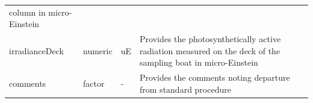 \documentclass[12pt,]{article}
\begin{document}
\begin{longtable}[]{@{}llll@{}}
\begin{minipage}[t]{0.38\columnwidth}
column in micro-Einstein\strut
\end{minipage}\tabularnewline
\begin{minipage}[t]{0.24\columnwidth}\raggedright
irradianceDeck\strut
\end{minipage} & \begin{minipage}[t]{0.15\columnwidth}\raggedright
numeric\strut
\end{minipage} & \begin{minipage}[t]{0.12\columnwidth}\raggedright
uE\strut
\end{minipage} & \begin{minipage}[t]{0.38\columnwidth}\raggedright
Provides the photosynthetically active radiation measured on the deck of
the sampling boat in micro-Einstein\strut
\end{minipage}\tabularnewline
\begin{minipage}[t]{0.24\columnwidth}\raggedright
comments\strut
\end{minipage} & \begin{minipage}[t]{0.15\columnwidth}\raggedright
factor\strut
\end{minipage} & \begin{minipage}[t]{0.12\columnwidth}\raggedright
-\strut
\end{minipage} & \begin{minipage}[t]{0.38\columnwidth}\raggedright
Provides the comments noting departure from standard procedure\strut
\end{minipage}\tabularnewline
\bottomrule
\end{longtable}
\end{document}
